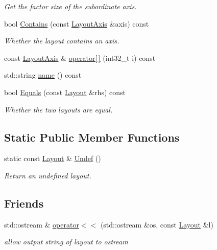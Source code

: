 \begin{DoxyCompactItemize}
\begin{DoxyCompactList}\small\item\em Get the factor size of the subordinate axis. \end{DoxyCompactList}\item 
bool \hyperlink{classtvm_1_1tir_1_1Layout_a57a19f7b1c1f3d05d333f6c10272006e}{Contains} (const \hyperlink{classtvm_1_1tir_1_1LayoutAxis}{Layout\+Axis} \&axis) const 
\begin{DoxyCompactList}\small\item\em Whether the layout contains an axis. \end{DoxyCompactList}\item 
const \hyperlink{classtvm_1_1tir_1_1LayoutAxis}{Layout\+Axis} \& \hyperlink{classtvm_1_1tir_1_1Layout_afa5744d258322fb0d9c50c52374bcd9f}{operator\mbox{[}$\,$\mbox{]}} (int32\+\_\+t i) const 
\item 
std\+::string \hyperlink{classtvm_1_1tir_1_1Layout_a9c22206c841f0f09e20d56b9c96b321d}{name} () const 
\item 
bool \hyperlink{classtvm_1_1tir_1_1Layout_a2edd48a0abe23330747e815e9598b62e}{Equals} (const \hyperlink{classtvm_1_1tir_1_1Layout}{Layout} \&rhs) const 
\begin{DoxyCompactList}\small\item\em Whether the two layouts are equal. \end{DoxyCompactList}\end{DoxyCompactItemize}
\subsection*{Static Public Member Functions}
\begin{DoxyCompactItemize}
\item 
static const \hyperlink{classtvm_1_1tir_1_1Layout}{Layout} \& \hyperlink{classtvm_1_1tir_1_1Layout_a1c7bdf466d341ad61aba104db318ee0e}{Undef} ()
\begin{DoxyCompactList}\small\item\em Return an undefined layout. \end{DoxyCompactList}\end{DoxyCompactItemize}
\subsection*{Friends}
\begin{DoxyCompactItemize}
\item 
std\+::ostream \& \hyperlink{classtvm_1_1tir_1_1Layout_a4d0f3b738af6b70040980e1287282377}{operator$<$$<$} (std\+::ostream \&os, const \hyperlink{classtvm_1_1tir_1_1Layout}{Layout} \&l)
\begin{DoxyCompactList}\small\item\em allow output string of layout to ostream \end{DoxyCompactList}\end{DoxyCompactItemize}


